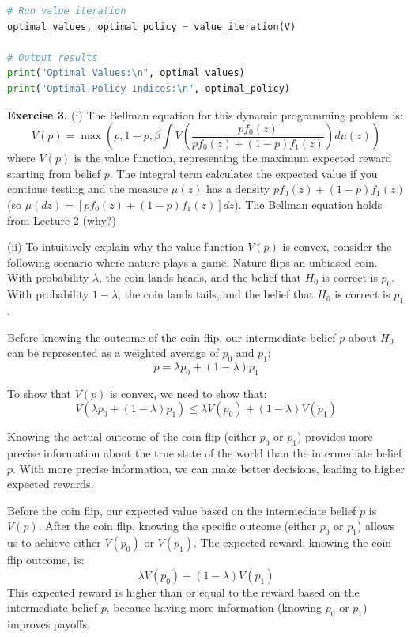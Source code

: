 \documentclass[letter,11pt]{article}
\begin{document}
\begin{lstlisting}[language=Python]
# Run value iteration
optimal_values, optimal_policy = value_iteration(V)

# Output results
print("Optimal Values:\n", optimal_values)
print("Optimal Policy Indices:\n", optimal_policy)

\end{lstlisting}


\textbf{Exercise 3.}
(i)    The Bellman equation for this dynamic programming problem is:
\[
V(p) = \max \left( p, 1-p, \beta \int V\left(\frac{pf_0(z)}{pf_0(z) + (1-p)f_1(z)}\right) d\mu(z) \right)
\]
where
 \(V(p)\) is the value function, representing the maximum expected reward starting from belief \(p\).
   The integral term calculates the expected value if you continue testing and the measure $\mu(z)$  has a density $pf_0(z) + (1-p)f_1(z)$ (so $\mu(dz) = [pf_0(z) + (1-p)f_1(z)]dz$). The Bellman equation holds from Lecture 2 (why?)


(ii) 
To intuitively explain why the value function \( V(p) \) is convex, consider the following scenario where nature plays a game.
Nature flips an unbiased coin.
    With probability \( \lambda \), the coin lands heads, and the belief that \( H_0 \) is correct is \( p_0 \).
   With probability \( 1 - \lambda \), the coin lands tails, and the belief that \( H_0 \) is correct is \( p_1 \).


Before knowing the outcome of the coin flip, our intermediate belief \( p \) about \( H_0 \) can be represented as a weighted average of \( p_0 \) and \( p_1 \):
\[
p = \lambda p_0 + (1 - \lambda) p_1
\]

To show that \( V(p) \) is convex, we need to show that:
\[
V(\lambda p_0 + (1 - \lambda) p_1) \leq \lambda V(p_0) + (1 - \lambda) V(p_1)
\]


Knowing the actual outcome of the coin flip (either \( p_0 \) or \( p_1 \)) provides more precise information about the true state of the world than the intermediate belief \( p \).
    With more precise information, we can make better decisions, leading to higher expected rewards.

Before the coin flip, our expected value based on the intermediate belief \( p \) is \( V(p) \).
     After the coin flip, knowing the specific outcome (either \( p_0 \) or \( p_1 \)) allows us to achieve either \( V(p_0) \) or \( V(p_1) \).
    The expected reward, knowing the coin flip outcome, is:
    \[
    \lambda V(p_0) + (1 - \lambda) V(p_1)
    \]
   This expected reward is higher than or equal to the reward based on the intermediate belief \( p \), because having more information (knowing \( p_0 \) or \( p_1 \)) improves payoffs. 
\end{document}
